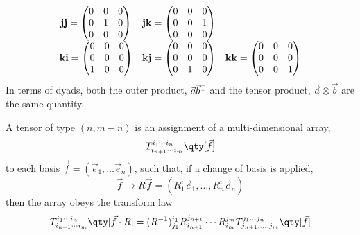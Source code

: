 \begin{definition}
\begin{equation*}
\begin{matrix}
\boldsymbol{\rm jj} =\begin{pmatrix} 0 & 0 & 0                                                     \\ 0 & 1 & 0 \\ 0 & 0 & 0 \end{pmatrix} & 
\boldsymbol{\rm jk} =\begin{pmatrix} 0 & 0 & 0                                                     \\ 0 & 0 & 1 \\ 0 & 0 & 0 \end{pmatrix} \\
\boldsymbol{\rm ki} =\begin{pmatrix} 0 & 0 & 0                                                     \\ 0 & 0 & 0 \\ 1 & 0 & 0 \end{pmatrix} & 
\boldsymbol{\rm kj} =\begin{pmatrix} 0 & 0 & 0                                                     \\ 0 & 0 & 0 \\ 0 & 1 & 0 \end{pmatrix} & 
\boldsymbol{\rm kk} =\begin{pmatrix} 0 & 0 & 0                                                     \\ 0 & 0 & 0 \\ 0 & 0 & 1 \end{pmatrix}
\end{matrix}
\end{equation*}
In terms of dyads, both the outer product, $\vec{a} \vec{b}^{\rm T}$
and the tensor product, $\vec{a} \otimes \vec{b}$ are the same quantity.
\end{definition}

\begin{definition}[Tensor]
  A tensor of type $(n, m-n)$ is an assignment of a multi-dimensional array, 
  \[ T_{i_{n+1} \cdots i_m}^{i_1 \cdots i_n} \qty[\vec{f}] \] to each
  basis $\vec{f} = (\vec{e}_1, \dots \vec{e}_n)$, such that, if a
  change of basis is applied,
\[ \vec{f} \to R \vec{f} = (R^i_1 \vec{e}_1, \dots, R^i_n \vec{e}_n ) \]
then the array obeys the transform law
\[ T_{i_{n+1} \cdots i_m}^{i_1 \cdots i_n} \qty[ \vec{f} \cdot R] = (R^{-1})^{i_1}_{j_1}  R^{j_{n+1}}_{i_{n+1}}  \cdots R^{j_m}_{i_m} T_{j_{n+1}, \dots, j_m}^{j_1 \dots j_n} \qty[\vec{f}] \]
\end{definition}

